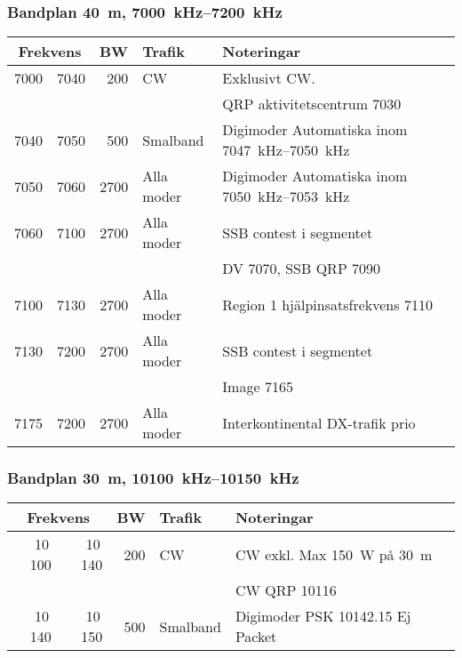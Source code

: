 \subsubsection{Bandplan \SI{40}{\metre}, \SIrange{7000}{7200}{\kilo\hertz}}
\begin{tabular}{rrrll}
\multicolumn{2}{c}{\textbf{Frekvens}} & \textbf{BW} & \textbf{Trafik} & \textbf{Noteringar} \\ \hline

7000 & 7040 & 200  & CW         & Exklusivt CW.                                        \\
     &      &      &            & QRP aktivitetscentrum \SI{7030}{}                    \\ \hline
7040 & 7050 & 500  & Smalband   & Digimoder Automatiska inom \SIrange{7047}{7050}{\kilo\hertz} \\ \hline
7050 & 7060 & 2700 & Alla moder & Digimoder Automatiska inom \SIrange{7050}{7053}{\kilo\hertz} \\ \hline
7060 & 7100 & 2700 & Alla moder & SSB contest i segmentet                              \\
     &      &      &            & DV \num{7070}, SSB QRP \num{7090}                    \\ \hline
7100 & 7130 & 2700 & Alla moder & Region 1 hjälpinsatsfrekvens \num{7110}           \\ \hline
7130 & 7200 & 2700 & Alla moder & SSB contest i segmentet                              \\
     &      &      &            & Image \num{7165}                                     \\ \hline
7175 & 7200 & 2700 & Alla moder & Interkontinental DX-trafik prio                      \\ \hline

\end{tabular}
\subsubsection{Bandplan \SI{30}{\metre}, \SIrange{10100}{10150}{\kilo\hertz}}
\begin{tabular}{rrrll}
\multicolumn{2}{c}{\textbf{Frekvens}} & \textbf{BW} & \textbf{Trafik} & \textbf{Noteringar} \\ \hline

10\,100 & 10\,140 & 200 & CW       & CW exkl. Max \SI{150}{\watt} på \SI{30}{m} \\
        &         &     &          & CW QRP \num{10116}                     \\ \hline
10\,140 & 10\,150 & 500 & Smalband & Digimoder PSK \num{10142,15} Ej Packet \\ \hline
\end{tabular}

